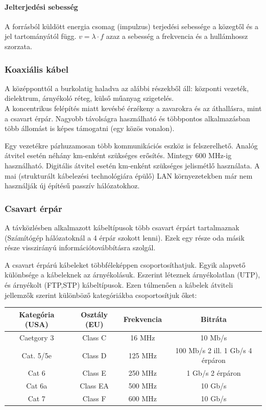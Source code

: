 \paragraph{Jelterjedési sebesség} A forrásból küldött energia csomag (impulzus) terjedési sebessége a közegtől és a jel tartományától függ. $v=\lambda\cdot f$ azaz a sebesség a frekvencia és a hullámhossz szorzata.

\subsubsection{Koaxiális kábel}
A középponttól a burkolatig haladva az alábbi részekből áll: központi vezeték, dielektrum, árnyékoló réteg, külső műanyag szigetelés.\\
A koncentrikus felépítés miatt kevésbé érzékeny a zavarokra és az áthallásra, mint a csavart érpár. Nagyobb távolságra használható és többpontos alkalmazásban több állomást is képes támogatni (egy közös vonalon).

Egy vezetékre párhuzamosan több kommunikációs eszköz is felszerelhető. 
Analóg átvitel esetén néhány km-enként szükséges erősítés. Mintegy 600 MHz-ig
használható. Digitális átvitel esetén km-enként szükséges jelismétlő használata.
A mai (strukturált kábelezési technológiára épülő) LAN környezetekben már nem
használják új építésű passzív hálózatokhoz.

\subsubsection{Csavart érpár}
A távközlésben alkalmazott kábeltípusok több csavart érpárt tartalmaznak (Számítógép hálózatoknál a 4 érpár szokott lenni). Ezek egy része oda másik része visszirányú információtovábbításra szolgál.

A csavart érpárú kábeleket többféleképpen csoportosíthatjuk. Egyik alapvető különbsége a kábeleknek az árnyékolásuk. Eszerint léteznek árnyékolatlan (UTP), és árnyékolt (FTP,STP) kábeltípusok. Ezen túlmenően a kábelek átviteli jellemzők szerint különböző kategóriákba csoportosítjuk őket:\\
\begin{tabular}{|c|c|c|c|}
	\hline 
	Kategória (USA) & Osztály (EU) & Frekvencia & Bitráta \\ 
	\hline 
	Caetgory 3 & Class C & 16 MHz & 10 Mb/s \\ 
	\hline 
	Cat. 5/5e & Class D & 125 MHz & 100 Mb/s 2 ill. 1 Gb/s 4 érpáron \\ 
	\hline 
	Cat 6 & Class E & 250 MHz & 1 Gb/s 2 érpáron \\ 
	\hline 
	Cat 6a & Class EA & 500 MHz & 10 Gb/s \\ 
	\hline 
	Cat 7 & Class F & 600 MHz & 10 Gb/s \\ 
	\hline 
\end{tabular} 

